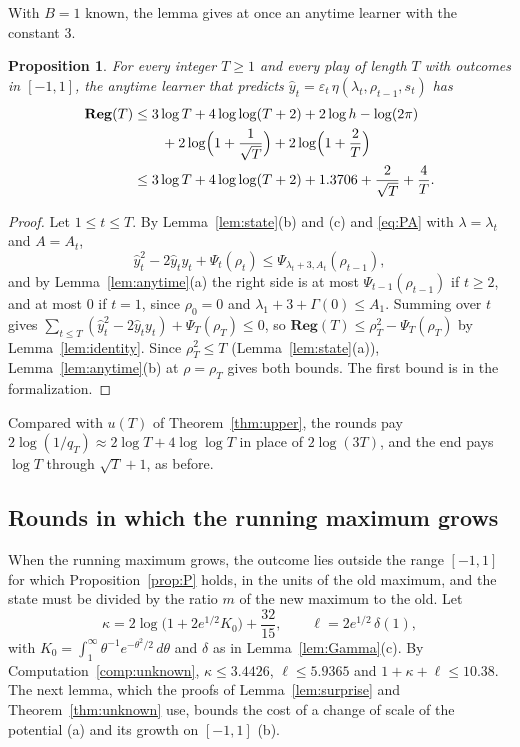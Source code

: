 \documentclass[12pt]{amsart}
\newtheorem{proposition}[theorem]{Proposition}
\theoremstyle{definition}
\numberwithin{equation}{section}
\newcommand{\Reg}{\mathbf{Reg}}
\newcommand{\yh}{\hat y}
\newcommand{\leanmap}[1]{\ignorespaces}
\newcommand{\mapnote}[1]{\ignorespaces}
\begin{document}
With $B=1$ known, the lemma gives at once an anytime learner with the constant $3$.

\begin{proposition}\label{prop:knownB}
\leanmap{RegretKappa.UnknownBT.theoremB, RegretKappa.UnknownBT.theoremBNum, RegretKappa.UnknownBT.theoremA,
  RegretKappa.UnknownBT.regret_le_RB}
\mapnote{Lean states it as \lname{RegretKappa.UnknownBT.TheoremB} and \lname{RegretKappa.UnknownBT.TheoremBNum}, for the learner \lname{RegretKappa.UnknownBT.learnerB} written out; it proves it with the potential $\Psi_t+2\log h$.}
For every integer $T\ge1$ and every play of length $T$ with outcomes in $[-1,1]$, the anytime learner that predicts $\yh_t=\varepsilon_t\,\eta(\lambda_t,\rho_{t-1},s_t)$ has
\begin{align*}
\Reg(T)&\le3\log T+4\log\log(T+2)+2\log h-\log(2\pi)\\
&\qquad+2\log\Bigl(1+\frac1{\sqrt T}\Bigr)+2\log\Bigl(1+\frac2T\Bigr)\\
&\le3\log T+4\log\log(T+2)+1.3706+\frac2{\sqrt T}+\frac4T .
\end{align*}
\end{proposition}

\begin{proof}
Let $1\le t\le T$. By Lemma~\ref{lem:state}(b) and (c) and \eqref{eq:PA} with $\lambda=\lambda_t$ and $A=A_t$,
\[
\yh_t^2-2\yh_ty_t+\Psi_t(\rho_t)\le\Psi_{\lambda_t+3,A_t}(\rho_{t-1}),
\]
and by Lemma~\ref{lem:anytime}(a) the right side is at most $\Psi_{t-1}(\rho_{t-1})$ if $t\ge2$, and at most $0$ if $t=1$, since $\rho_0=0$ and $\lambda_1+3+\Gamma(0)\le A_1$. Summing over $t$ gives $\sum_{t\le T}(\yh_t^2-2\yh_ty_t)+\Psi_T(\rho_T)\le0$, so $\Reg(T)\le\rho_T^2-\Psi_T(\rho_T)$ by Lemma~\ref{lem:identity}. Since $\rho_T^2\le T$ (Lemma~\ref{lem:state}(a)), Lemma~\ref{lem:anytime}(b) at $\rho=\rho_T$ gives both bounds. The first bound is  in the formalization.
\end{proof}

Compared with $u(T)$ of Theorem~\ref{thm:upper}, the rounds pay $2\log(1/q_T)\approx2\log T+4\log\log T$ in place of $2\log(3T)$, and the end pays $\log T$ through $\sqrt T+1$, as before.

\subsection{Rounds in which the running maximum grows}
When the running maximum grows, the outcome lies outside the range $[-1,1]$ for which Proposition~\ref{prop:P} holds, in the units of the old maximum, and the state must be divided by the ratio $m$ of the new maximum to the old. Let
\[
\kappa=2\log\bigl(1+2e^{1/2}K_0\bigr)+\frac{32}{15},\qquad\ell=2e^{1/2}\,\delta(1),
\]
with $K_0=\int_1^\infty\theta^{-1}e^{-\theta^2/2}\,d\theta$ and $\delta$ as in Lemma~\ref{lem:Gamma}(c). By Computation~\ref{comp:unknown}, $\kappa\le3.4426$, $\ell\le5.9365$ and $1+\kappa+\ell\le10.38$. The next lemma, which the proofs of Lemma~\ref{lem:surprise} and Theorem~\ref{thm:unknown} use, bounds the cost of a change of scale of the potential (a) and its growth on $[-1,1]$ (b).
\end{document}
